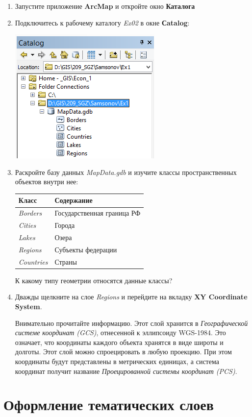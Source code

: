 \documentclass[]{book}
\theoremstyle{definition}
\theoremstyle{definition}
\theoremstyle{definition}
\theoremstyle{remark}
\begin{document}
\begin{enumerate}
\def\labelenumi{\arabic{enumi}.}
\item
  Запустите приложение \textbf{ArcMap} и откройте окно \textbf{Каталога}
\item
  Подключитесь к рабочему каталогу \emph{Ex02} в окне \textbf{Сatalog}:

  \includegraphics{images/Ex02/image2.png}
\item
  Раскройте базу данных \emph{MapData.gdb} и изучите классы
  пространственных объектов внутри нее:

  \begin{longtable}[]{@{}ll@{}}
  \toprule
  \textbf{Класс} & \textbf{Содержание}\tabularnewline
  \midrule
  \endhead
  \emph{Borders} & Государственная граница РФ\tabularnewline
  \emph{Cities} & Города\tabularnewline
  \emph{Lakes} & Озера\tabularnewline
  \emph{Regions} & Субъекты федерации\tabularnewline
  \emph{Countries} & Страны\tabularnewline
  \bottomrule
  \end{longtable}

  К какому типу геометрии относятся данные классы?
\item
  Дважды щелкните на слое \emph{Regions} и перейдите на вкладку
  \textbf{XY Coordinate System}.

  Внимательно прочитайте информацию. Этот слой хранится в
  \emph{Географической системе координат (GCS)}, отнесенной к эллипсоиду
  WGS-1984. Это означает, что координаты каждого объекта хранятся в виде
  широты и долготы. Этот слой можно спроецировать в любую проекцию. При
  этом координаты будут представлены в метрических единицах, а система
  координат получит название \emph{Проецированной системы координат
  (PCS)}.
\end{enumerate}

\hypertarget{map-design-economic-thematic}{%
\section{Оформление тематических
слоев}\label{map-design-economic-thematic}}
\end{document}
